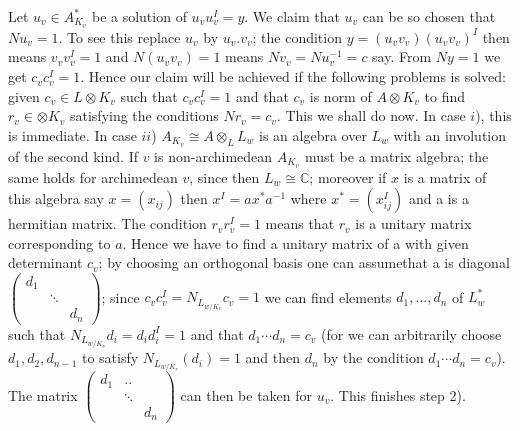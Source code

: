 \setcounter{proofofstep}{1}
\begin{proofofstep}%
Let $u_v \in A^*_{K_v}$ be a solution of $u_vu^I_v=y$. We claim that
$u_v$ can be so chosen that $Nu_v=1$. To see this replace $u_v$ by
$u_v.v_v$; the condition $y=(u_v v_v)(u_v v_v)^I$ then means
$v_vv^I_v=1$ and $N(u_v v_v)=1$ means $N v_v=Nu^{-1}_v=c$ say. From
$Ny=1$ we get $c_vc^I_v=1$. Hence our claim will be achieved if the
following problems is solved: given $c_v \in L \otimes K_v$ such that
$c_vc_v^I=1$ and that $c_v$ is norm of $A \otimes K_v$ to find $r_v
\in \otimes K_v$ satisfying the conditions $N r_v=c_v$. This we shall
do now. In case $i$), this is immediate. In case $ii$) $A_{K_v} \cong A
\otimes_L L_w$ is an algebra over $L_w$ with an involution of the
second kind. If $v$ is non-archimedean $A_{K_v}$ must be a matrix
algebra; the same holds for archimedean $v$, since then $L_w \cong
\mathbb{C}$; moreover if $x$ is a matrix of this algebra say
$x=(x_{ij})$ then $x^I=ax^*a^{-1}$ where $x^*=(x^I_{ij})$ and a is a
hermitian matrix. The condition $r_vr^I_v=1$ means that $r_v$ is a
unitary matrix corresponding to $a$. Hence we have to find a unitary
matrix of a with given determinant $c_v$; by choosing an orthogonal
basis one can assume\pageoriginale that a is diagonal 
$\begin{pmatrix}
 d_1 & &\\
 &\ddots & \\
& &d_n 
\end{pmatrix}$; since
   $c_vc_v^I=N_{L_{w/K_v}}c_v=1$ we can find elements $d_1, \ldots
,d_n$ of $L^*_w$ such that $N_{L_{w/K_v}}d_i=d_id_i^I=1$ and
that $d_1 \cdots d_n=c_v$ (for we can arbitrarily choose
$d_1,d_2,d_{n-1}$ to satisfy $N_{L_{w/K_v}} (d_i)=1$ and then $d_n$ by
the condition $d_1 \cdots d_n=c_v$). The matrix 
 $ 
\begin{pmatrix}
d_1 &  ..\\
 &\ddots & \\
& &d_n
\end{pmatrix}
$ can then be taken for $u_v$. This finishes step 2).
 \end{proofofstep}
 
